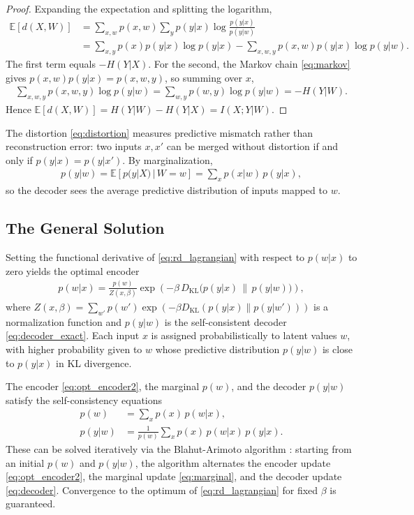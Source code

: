 \documentclass[11pt]{article}
\begin{document}
\begin{proof}
Expanding the expectation and splitting the logarithm,
\begin{align}
    \mathbb{E}[d(X,W)]
    &= \sum_{x,w} p(x,w) \sum_y p(y|x)\log\frac{p(y|x)}{p(y|w)} \\
    &= \sum_{x,y} p(x)p(y|x)\log p(y|x)
    - \sum_{x,w,y} p(x,w)p(y|x)\log p(y|w).
\end{align}
The first term equals $-H(Y|X)$.
For the second, the Markov chain \eqref{eq:markov} gives
$p(x,w)p(y|x)=p(x,w,y)$, so summing over $x$,
\begin{align}
    \sum_{x,w,y} p(x,w,y)\log p(y|w)
    = \sum_{w,y} p(w,y)\log p(y|w) = -H(Y|W).
\end{align}
Hence $\mathbb{E}[d(X,W)] = H(Y|W) - H(Y|X) = I(X;Y|W)$.
\end{proof}

The distortion \eqref{eq:distortion} measures predictive mismatch
rather than reconstruction error: two inputs $x,x'$ can be merged
without distortion if and only if $p(y|x)=p(y|x')$.
By marginalization,
\begin{align}
    p(y|w) = \mathbb{E}[p(y|X)\,|\,W=w] = \sum_{x} p(x|w)\,p(y|x),
    \label{eq:decoder_exact}
\end{align}
so the decoder sees the average predictive distribution of inputs
mapped to $w$.

\subsection{The General Solution}
\label{sec:general_solution}

Setting the functional derivative of \eqref{eq:rd_lagrangian} with
respect to $p(w|x)$ to zero yields the optimal encoder
\begin{align}
    p(w|x) = \frac{p(w)}{Z(x,\beta)}
    \exp\!\left(-\beta\,D_{\mathrm{KL}}
    \bigl(p(y|x)\,\|\,p(y|w)\bigr)\right),
    \label{eq:opt_encoder2}
\end{align}
where $Z(x,\beta)=\sum_{w'}p(w')\exp(-\beta
D_{\mathrm{KL}}(p(y|x)\|p(y|w')))$ is a normalization function and
$p(y|w)$ is the self-consistent decoder \eqref{eq:decoder_exact}.
Each input $x$ is assigned probabilistically to latent values $w$,
with higher probability given to $w$ whose predictive distribution
$p(y|w)$ is close to $p(y|x)$ in KL divergence.

The encoder \eqref{eq:opt_encoder2}, the marginal $p(w)$, and the
decoder $p(y|w)$ satisfy the self-consistency equations
\begin{align}
    p(w) &= \sum_x p(x)\,p(w|x),
    \label{eq:marginal}\\
    p(y|w) &= \frac{1}{p(w)}\sum_x p(x)\,p(w|x)\,p(y|x).
    \label{eq:decoder}
\end{align}
These can be solved iteratively via the Blahut-Arimoto algorithm
\cite{blahut1972computation,arimoto1972algorithm}: starting from an
initial $p(w)$ and $p(y|w)$, the algorithm alternates the encoder
update \eqref{eq:opt_encoder2}, the marginal update \eqref{eq:marginal},
and the decoder update \eqref{eq:decoder}.
Convergence to the optimum of \eqref{eq:rd_lagrangian} for fixed $\beta$
is guaranteed.
\end{document}
